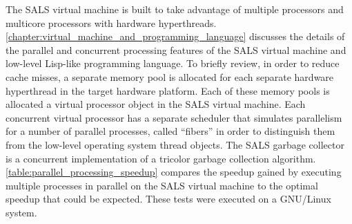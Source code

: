 The SALS virtual machine is built to take advantage of multiple
processors and multicore processors with hardware hyperthreads.
{\mbox{\autoref{chapter:virtual_machine_and_programming_language}}}
discusses the details of the parallel and concurrent processing
features of the SALS virtual machine and low-level Lisp-like
programming language.  To briefly review, in order to reduce cache
misses, a separate memory pool is allocated for each separate hardware
hyperthread in the target hardware platform.  Each of these memory
pools is allocated a virtual processor object in the SALS virtual
machine.  Each concurrent virtual processor has a separate scheduler
that simulates parallelism for a number of parallel processes, called
``fibers'' in order to distinguish them from the low-level operating
system thread objects.  The SALS garbage collector is a concurrent
implementation of a tricolor garbage collection algorithm.
{\mbox{\autoref{table:parallel_processing_speedup}}} compares the
speedup gained by executing multiple processes in parallel on the SALS
virtual machine to the optimal speedup that could be expected.  These
tests were executed on a GNU/Linux system.
